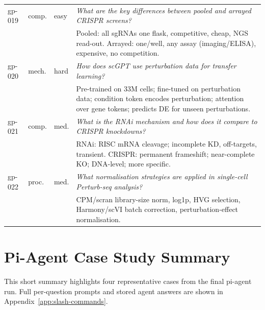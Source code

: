 \documentclass[12pt, a4paper]{article}
\begin{document}
\begin{longtable}{@{}llp{1.0cm}p{8.8cm}@{}}
gp-019 & comp. & easy &
  \textit{What are the key differences between pooled and arrayed CRISPR screens?}\\
& & & \scriptsize Pooled: all sgRNAs one flask, competitive, cheap, NGS read-out. Arrayed: one/well, any assay (imaging/ELISA), expensive, no competition. \\[2pt]

gp-020 & mech. & hard &
  \textit{How does scGPT use perturbation data for transfer learning?}\\
& & & \scriptsize Pre-trained on 33M cells; fine-tuned on perturbation data; condition token encodes perturbation; attention over gene tokens; predicts DE for unseen perturbations. \\[2pt]

gp-021 & comp. & med. &
  \textit{What is the RNAi mechanism and how does it compare to CRISPR knockdowns?}\\
& & & \scriptsize RNAi: RISC mRNA cleavage; incomplete KD, off-targets, transient. CRISPR: permanent frameshift; near-complete KO; DNA-level; more specific. \\[2pt]

gp-022 & proc. & med. &
  \textit{What normalisation strategies are applied in single-cell Perturb-seq analysis?}\\
& & & \scriptsize CPM/scran library-size norm, log1p, HVG selection, Harmony/scVI batch correction, perturbation-effect normalisation. \\

\end{longtable}


\section{Pi-Agent Case Study Summary}
\label{app:cases}

This short summary highlights four representative cases from the final pi-agent run.
Full per-question prompts and stored agent answers are shown in Appendix~\ref{app:slash-commands}.
\end{document}
